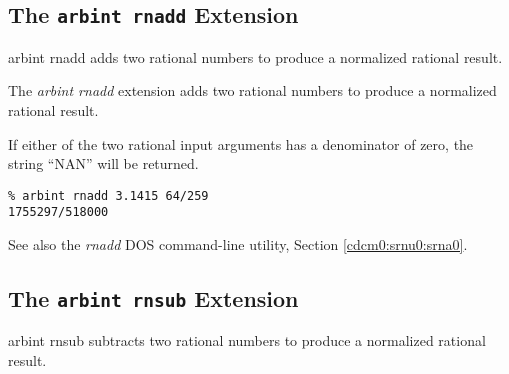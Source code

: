 \subsection{The \texttt{arbint rnadd} Extension}
\label{cxtn0:srne0:srad0}

\begin{tclcommandname}{arbint rnadd}%
adds two rational numbers to produce a normalized rational result.
\end{tclcommandname}

\begin{tclcommandsynopsis}
\end{tclcommandsynopsis}

\begin{tclcommanddescription}
The \emph{arbint rnadd} extension adds two rational numbers to produce a 
normalized rational result.

If either of the two rational input arguments has a denominator of zero,
the string ``NAN'' will be returned.
\end{tclcommanddescription}

\begin{tclcommandsampleinvocations}
\begin{scriptsize}
\begin{verbatim}
% arbint rnadd 3.1415 64/259
1755297/518000
\end{verbatim}
\end{scriptsize}
\end{tclcommandsampleinvocations}

\begin{tclcommandseealso}
See also the \emph{rnadd} DOS command-line utility, 
Section \ref{cdcm0:srnu0:srna0}.
\end{tclcommandseealso}


\subsection{The \texttt{arbint rnsub} Extension}
\label{cxtn0:srne0:srsb0}

\begin{tclcommandname}{arbint rnsub}%
subtracts two rational numbers to produce a normalized rational result.
\end{tclcommandname}

